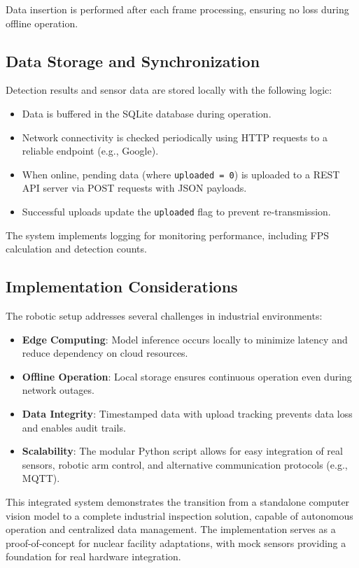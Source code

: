 \documentclass[12pt,a4paper]{article}
\begin{document}
Data insertion is performed after each frame processing, ensuring no loss during offline operation.

\subsection{Data Storage and Synchronization}

Detection results and sensor data are stored locally with the following logic:
\begin{itemize}
\item Data is buffered in the SQLite database during operation.
\item Network connectivity is checked periodically using HTTP requests to a reliable endpoint (e.g., Google).
\item When online, pending data (where \texttt{uploaded = 0}) is uploaded to a REST API server via POST requests with JSON payloads.
\item Successful uploads update the \texttt{uploaded} flag to prevent re-transmission.
\end{itemize}

The system implements logging for monitoring performance, including FPS calculation and detection counts.

\subsection{Implementation Considerations}

The robotic setup addresses several challenges in industrial environments:
\begin{itemize}
\item \textbf{Edge Computing}: Model inference occurs locally to minimize latency and reduce dependency on cloud resources.
\item \textbf{Offline Operation}: Local storage ensures continuous operation even during network outages.
\item \textbf{Data Integrity}: Timestamped data with upload tracking prevents data loss and enables audit trails.
\item \textbf{Scalability}: The modular Python script allows for easy integration of real sensors, robotic arm control, and alternative communication protocols (e.g., MQTT).
\end{itemize}

This integrated system demonstrates the transition from a standalone computer vision model to a complete industrial inspection solution, capable of autonomous operation and centralized data management. The implementation serves as a proof-of-concept for nuclear facility adaptations, with mock sensors providing a foundation for real hardware integration.
\end{document}
